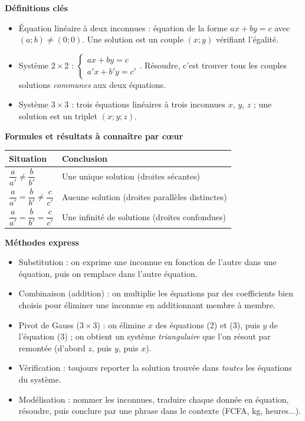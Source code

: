 \documentclass[11pt]{article}
\newcommand{\cle}[1]{{\popxbold\color{popdark}#1}}
\begin{document}
\begin{bilan}
\textbf{Définitions clés}
\begin{itemize}
  \item \cle{Équation linéaire} à deux inconnues : équation de la forme $ax+by=c$ avec $(a;b)\neq(0;0)$. Une solution est un \cle{couple} $(x;y)$ vérifiant l'égalité.
  \item \cle{Système} $2\times 2$ : $\begin{cases} ax+by=c \\ a'x+b'y=c' \end{cases}$. Résoudre, c'est trouver tous les couples solutions \emph{communes} aux deux équations.
  \item Système $3\times 3$ : trois équations linéaires à trois inconnues $x$, $y$, $z$ ; une solution est un \cle{triplet} $(x;y;z)$.
\end{itemize}

\textbf{Formules et résultats à connaître par cœur}
\begin{center}
\begin{tabularx}{\linewidth}{|l|X|}\hline
\rowcolor{popblueL} \textbf{Situation} & \textbf{Conclusion} \\ \hline
$\dfrac{a}{a'}\neq\dfrac{b}{b'}$ & Une \cle{unique} solution (droites sécantes) \\ \hline
$\dfrac{a}{a'}=\dfrac{b}{b'}\neq\dfrac{c}{c'}$ & \cle{Aucune} solution (droites parallèles distinctes) \\ \hline
$\dfrac{a}{a'}=\dfrac{b}{b'}=\dfrac{c}{c'}$ & Une \cle{infinité} de solutions (droites confondues) \\ \hline
\end{tabularx}
\end{center}

\textbf{Méthodes express}
\begin{itemize}
  \item \cle{Substitution} : on exprime une inconnue en fonction de l'autre dans une équation, puis on remplace dans l'autre équation.
  \item \cle{Combinaison} (addition) : on multiplie les équations par des coefficients bien choisis pour éliminer une inconnue en additionnant membre à membre.
  \item \cle{Pivot de Gauss} ($3\times 3$) : on élimine $x$ des équations (2) et (3), puis $y$ de l'équation (3) ; on obtient un système \emph{triangulaire} que l'on résout par \cle{remontée} (d'abord $z$, puis $y$, puis $x$).
  \item \cle{Vérification} : toujours reporter la solution trouvée dans \emph{toutes} les équations du système.
  \item \cle{Modélisation} : nommer les inconnues, traduire chaque donnée en équation, résoudre, puis conclure par une phrase dans le contexte (FCFA, kg, heures...).
\end{itemize}
\end{bilan}
\end{document}
